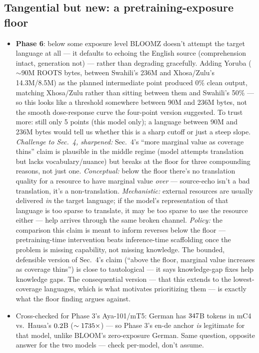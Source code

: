 \documentclass[11pt]{article}
\begin{document}
\subsection*{Tangential but new: a pretraining-exposure floor}

\begin{itemize}
  \item \textbf{Phase 6}: below some exposure level BLOOMZ doesn't attempt the target language
    at all --- it defaults to echoing the English source (comprehension intact, generation
    not) --- rather than degrading gracefully. Adding Yoruba ($\sim$90M ROOTS bytes, between
    Swahili's 236M and Xhosa/Zulu's 14.3M/8.5M) as the planned intermediate point produced
    0\% clean output, matching Xhosa/Zulu rather than sitting between them and Swahili's 50\%
    --- so this looks like a threshold somewhere between 90M and 236M bytes, not the smooth
    dose-response curve the four-point version suggested. To trust more: still only 5 points
    (this model only); a language between 90M and 236M bytes would tell us whether this is a
    sharp cutoff or just a steep slope. \emph{Challenge to Sec.~4, sharpened:} Sec.~4's
    ``more marginal value as coverage thins'' claim is plausible in the middle regime (model
    attempts translation but lacks vocabulary/nuance) but breaks at the floor for three
    compounding reasons, not just one. \emph{Conceptual:} below the floor there's no
    translation quality for a resource to have marginal value \emph{over} --- source-echo
    isn't a bad translation, it's a non-translation. \emph{Mechanistic:} external resources
    are usually delivered \emph{in} the target language; if the model's representation of
    that language is too sparse to translate, it may be too sparse to use the resource
    either --- help arrives through the same broken channel. \emph{Policy:} the comparison
    this claim is meant to inform reverses below the floor --- pretraining-time intervention
    beats inference-time scaffolding once the problem is missing capability, not missing
    knowledge. The bounded, defensible version of Sec.~4's claim (``above the floor, marginal
    value increases as coverage thins'') is close to tautological --- it says knowledge-gap
    fixes help knowledge gaps. The consequential version --- that this extends to the
    lowest-coverage languages, which is what motivates prioritizing them --- is exactly what
    the floor finding argues against.
  \item Cross-checked for Phase 3's Aya-101/mT5: German has $347$B tokens
    in mC4 vs.\ Hausa's $0.2$B ($\sim1735\times$) --- so
    Phase 3's en-de anchor \emph{is} legitimate for that model, unlike BLOOM's zero-exposure
    German. Same question, opposite answer for the two models --- check per-model, don't assume.
\end{itemize}
\end{document}
